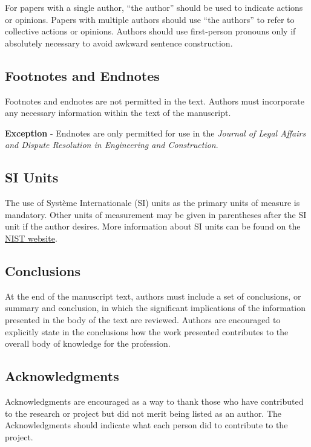 \documentclass[Journal,letterpaper]{ascelike-new}
\begin{document}
For papers with a single author, ``the author'' should be used to indicate actions or opinions. Papers with multiple authors should use ``the authors'' to refer to collective actions or opinions. Authors should use first-person pronouns only if absolutely necessary to avoid awkward sentence construction.

\subsection{Footnotes and Endnotes}

Footnotes and endnotes are not permitted in the text. Authors must incorporate any necessary information within the text of the manuscript.

\textbf{Exception} - Endnotes are only permitted for use in the \textit{Journal of Legal Affairs and Dispute Resolution in Engineering and Construction}.

\subsection{SI Units}

The use of Système Internationale (SI) units as the primary units of measure is mandatory. Other units of measurement may be given in parentheses after the SI unit if the author desires. More information about SI units can be found on the \href{http://physics.nist.gov/cuu/Units/index.html}{NIST website}.

\subsection{Conclusions}

At the end of the manuscript text, authors must include a set of conclusions, or summary and conclusion, in which the significant implications of the information presented in the body of the text are reviewed. Authors are encouraged to explicitly state in the conclusions how the work presented contributes to the overall body of knowledge for the profession.

\subsection{Acknowledgments}

Acknowledgments are encouraged as a way to thank those who have contributed to the research or project but did not merit being listed as an author. The Acknowledgments should indicate what each person did to contribute to the project.
\end{document}

